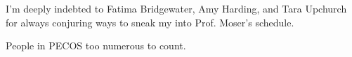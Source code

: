 

I'm deeply indebted to Fatima Bridgewater, Amy Harding, and Tara Upchurch
for always conjuring ways to sneak my into Prof. Moser's schedule.

People in PECOS too numerous to count. 

%
%
%
%

%
%





